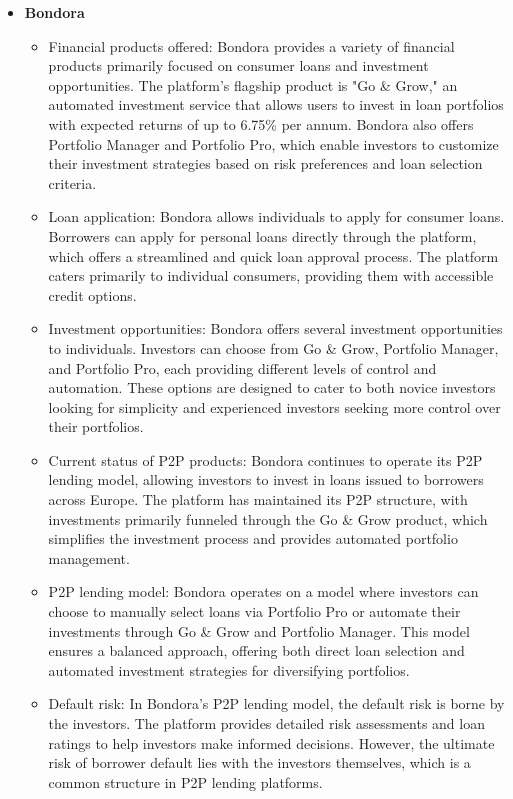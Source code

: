 \documentclass{article}
\begin{document}
\begin{itemize}
    \item \textbf{Bondora}
        \begin{itemize}
            \item Financial products offered: Bondora provides a variety of financial products primarily focused on consumer loans and investment opportunities. The platform's flagship product is "Go \& Grow," an automated investment service that allows users to invest in loan portfolios with expected returns of up to 6.75\% per annum. Bondora also offers Portfolio Manager and Portfolio Pro, which enable investors to customize their investment strategies based on risk preferences and loan selection criteria.
            \item Loan application: Bondora allows individuals to apply for consumer loans. Borrowers can apply for personal loans directly through the platform, which offers a streamlined and quick loan approval process. The platform caters primarily to individual consumers, providing them with accessible credit options.
            \item Investment opportunities: Bondora offers several investment opportunities to individuals. Investors can choose from Go \& Grow, Portfolio Manager, and Portfolio Pro, each providing different levels of control and automation. These options are designed to cater to both novice investors looking for simplicity and experienced investors seeking more control over their portfolios.
            \item Current status of P2P products: Bondora continues to operate its P2P lending model, allowing investors to invest in loans issued to borrowers across Europe. The platform has maintained its P2P structure, with investments primarily funneled through the Go \& Grow product, which simplifies the investment process and provides automated portfolio management.
            \item P2P lending model: Bondora operates on a model where investors can choose to manually select loans via Portfolio Pro or automate their investments through Go \& Grow and Portfolio Manager. This model ensures a balanced approach, offering both direct loan selection and automated investment strategies for diversifying portfolios.
            \item Default risk: In Bondora’s P2P lending model, the default risk is borne by the investors. The platform provides detailed risk assessments and loan ratings to help investors make informed decisions. However, the ultimate risk of borrower default lies with the investors themselves, which is a common structure in P2P lending platforms.
        \end{itemize}  


\end{itemize}
\end{document}
